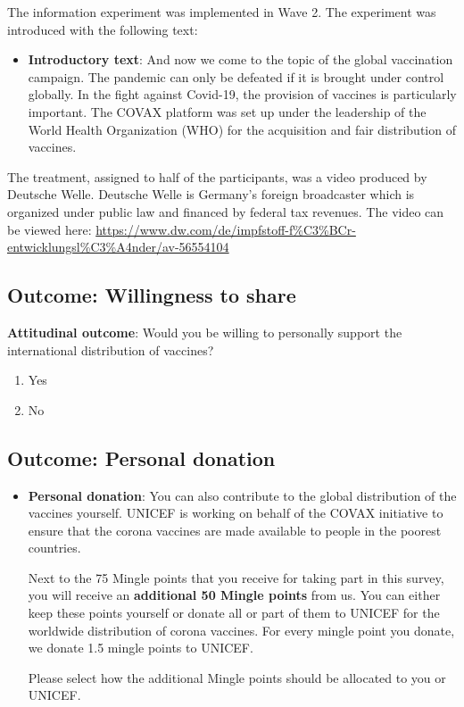 \documentclass[12pt,oneside]{article}
\begin{document}
The information experiment was implemented in Wave 2. The experiment was introduced with the following text:

\begin{itemize}
\item
  \textbf{Introductory text}: And now we come to the topic of the global
  vaccination campaign. The pandemic can only be defeated if it is
  brought under control globally. In the fight against Covid-19, the
  provision of vaccines is particularly important. The COVAX platform
  was set up under the leadership of the World Health Organization (WHO)
  for the acquisition and fair distribution of vaccines.
\end{itemize}

The treatment, assigned to half of the participants, was a video produced by Deutsche Welle. Deutsche Welle is Germany's foreign broadcaster which is organized under public law and financed by federal tax revenues. The video can be viewed here: 
\url{https://www.dw.com/de/impfstoff-f\%C3\%BCr-entwicklungsl\%C3\%A4nder/av-56554104}
	
\subsection{Outcome: Willingness to share}

 \textbf{Attitudinal outcome}: Would you be willing to personally support the international distribution of vaccines?
  \begin{enumerate}
	\item Yes
  \item No 
	\end{enumerate}

\hypertarget{outcome-personal-donation}{%
\subsection{Outcome: Personal
donation}\label{outcome-personal-donation}}

\begin{itemize}
\item
  \textbf{Personal donation}: You can also contribute to the global
  distribution of the vaccines yourself. UNICEF is working on behalf of
  the COVAX initiative to ensure that the corona vaccines are made
  available to people in the poorest countries.

  Next to the 75 Mingle points that you receive for taking part in this
  survey, you will receive an \textbf{additional 50 Mingle points} from
  us. You can either keep these points yourself or donate all or part of
  them to UNICEF for the worldwide distribution of corona vaccines. For
  every mingle point you donate, we donate 1.5 mingle points to UNICEF.

  Please select how the additional Mingle points should be allocated to
  you or UNICEF.
\end{itemize}
\end{document}
